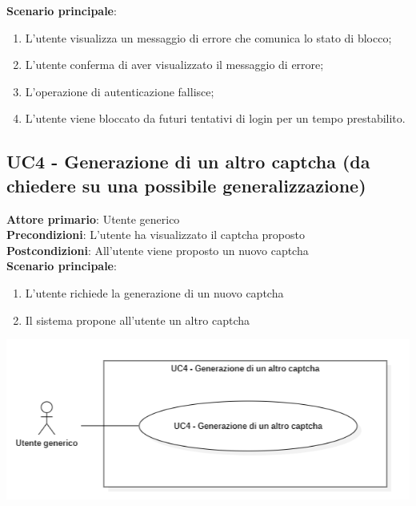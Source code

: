 \textbf{Scenario principale}:
\begin{enumerate}
   \item L'utente visualizza un messaggio di errore che comunica lo stato di blocco;
   \item L'utente conferma di aver visualizzato il messaggio di errore;
   \item L'operazione di autenticazione fallisce;
   \item L'utente viene bloccato da futuri tentativi di login per un tempo prestabilito.
\end{enumerate}

\subsection{UC4 - Generazione di un altro captcha (da chiedere su una possibile generalizzazione)}
\textbf{Attore primario}: Utente generico\\
\textbf{Precondizioni}: L'utente ha visualizzato il captcha proposto\\
\textbf{Postcondizioni}: All'utente viene proposto un nuovo captcha\\

\textbf{Scenario principale}:
\begin{enumerate}
   \item L'utente richiede la generazione di un nuovo captcha
   \item Il sistema propone all'utente un altro captcha
\end{enumerate}

\begin{center}
	\includegraphics[scale = 0.9]{img/Generazione_captcha.png}\\
\end{center}